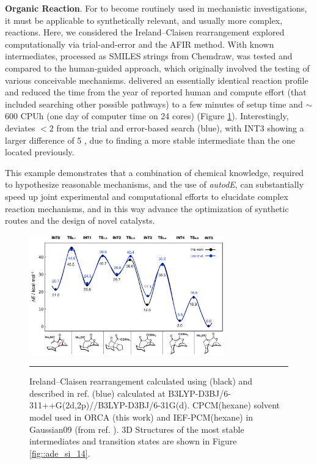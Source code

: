 \documentclass[../../main.tex]{subfiles}
\begin{document}
{\bfseries{Organic Reaction}}. For \ade to become routinely used in mechanistic investigations, it must be applicable to synthetically relevant, and usually more complex, reactions. Here, we considered the Ireland--Claisen rearrangement explored computationally via trial-and-error and the AFIR method.\cite{Lee2019} With known intermediates, processed as SMILES strings from Chemdraw\texttrademark, \ade was tested and compared to the human-guided approach, which originally involved the testing of various conceivable mechanisms. \ade delivered an essentially identical reaction profile and reduced the time from the year of reported human and compute effort (that included searching other possible pathways) to a few minutes of setup time and $\sim$600 CPUh (one day of computer time on 24 cores) (Figure \ref{fig::ade_7}). Interestingly, \ade deviates $< 2$ \kcalx from the trial and error-based search (blue), with INT3 showing a larger difference of 5 \kcal, due to \ade finding a more stable intermediate than the one located previously.

This example demonstrates that a combination of chemical knowledge, required to hypothesize reasonable mechanisms, and the use of \emph{autodE}, can substantially speed up joint experimental and computational efforts to elucidate complex reaction mechanisms, and in this way advance the optimization of synthetic routes and the design of novel catalysts.


\begin{figure}
	
	\vspace{0.2cm}
	\centering
	\includegraphics[width=0.75\textwidth]{5/autode/figs/fig7}
	\vspace{0.2cm}
	\hrule
	\caption{Ireland--Claisen rearrangement calculated using \ade (black) and described in ref. \cite{Lee2019} (blue) calculated at B3LYP-D3BJ/6-311++G(2d,2p)//B3LYP-D3BJ/6-31G(d). CPCM(hexane) solvent model used in ORCA (this work) and IEF-PCM(hexane) in Gaussian09 (from ref. \cite{Lee2019}). 3D Structures of the most stable intermediates and transition states are shown in Figure \ref{fig::ade_si_14}.}
	\label{fig::ade_7}
	
\end{figure}
\end{document}
